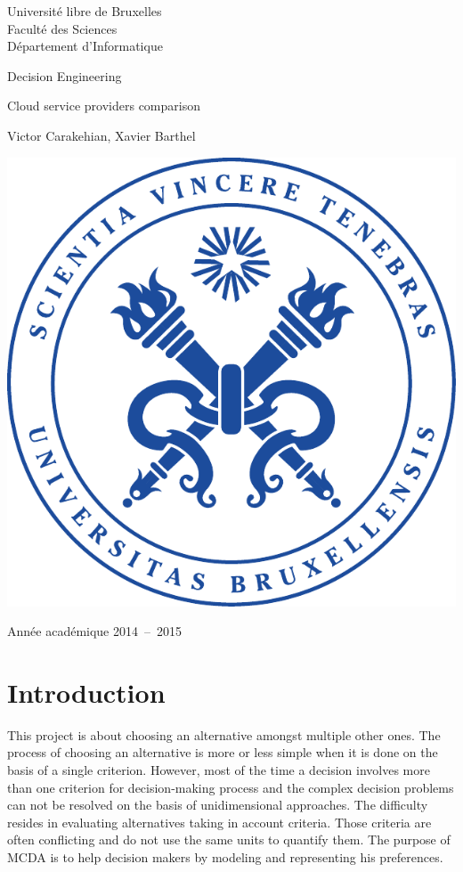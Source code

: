 \documentclass[a4paper,11pt]{article}
\begin{document}
\begin{titlepage}
\begin{center}
	{\sc Université libre de Bruxelles}\\
	Faculté des Sciences\\
	Département d'Informatique
	\vfill{}\vfill{}

	{\Huge \par}{\Huge Decision Engineering}{\Huge \par}
	{\Huge \par}{\huge Cloud service providers comparison}{\Huge \par}

	{\huge \par}{\Large Victor Carakehian, }
				{\Large Xavier Barthel}{\huge \par}
	
	\vfill{}
	\includegraphics{img/ulb_symbol.pdf}

	\vfill{}\vfill{}
	Année académique 2014~--~2015
\end{center}
\end{titlepage}

\section{Introduction}
This project is about choosing an alternative amongst multiple other ones. The process of choosing an alternative is more or less simple when it is done on the basis of a single criterion. However, most of the time a decision involves more than one criterion for decision-making process and the complex decision problems can not be resolved on the basis of unidimensional approaches. The difficulty resides in evaluating alternatives taking in account criteria. Those criteria are often conflicting and do not use the same units to quantify them. The purpose of MCDA is to help decision makers by modeling and representing his preferences.\\ %
\end{document}
